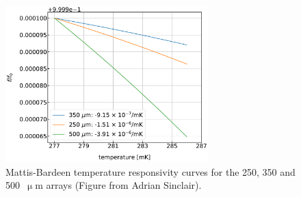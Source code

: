 \begin{figure}[!htbp]
\centering
\includegraphics[width=0.7\textwidth]{figures/blast_data/sweeps/temp_response}
\caption[~Mattis-Bardeen temperature responsivity curves for the 250, 350 and 500  arrays.]{Mattis-Bardeen temperature responsivity curves for the 250, 350 and 500~$\upmu$m arrays (Figure from Adrian Sinclair).}
\label{fig:temp response}
\end{figure}

